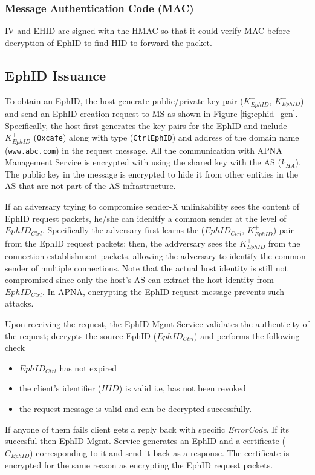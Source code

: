 \subsubsection{Message Authentication Code (MAC)}
IV and EHID are signed with the HMAC so that it could verify MAC before decryption of EphID to find HID to forward the packet.

\subsection{EphID Issuance} \label{sec:why_encrypt}
To obtain an EphID, the host generate public/private key pair ($K^{+}_{EphID}$, $K^{-}_{EphID}$) and send an EphID creation request to MS as shown in Figure \ref{fig:ephid_gen}. Specifically, the host first generates the key pairs for the EphID and include $K^{+}_{EphID}$ (\texttt{0xcafe}) along with type (\texttt{CtrlEphID}) and address of the domain name (\texttt{www.abc.com}) in the request message. All the communication with APNA Management Service is encrypted with using the shared key with the AS ($k_{HA}$). The public key in the message is encrypted to hide it from other entities in the AS that are not part of the AS infrastructure.

If an adversary trying to compromise sender-X unlinkability sees the content of EphID request packets, he/she can idenitfy a common sender at the level of $EphID_{Ctrl}$. Specifically the adversary first learns the ($EphID_{Ctrl}$, $K^{+}_{EphID}$) pair from the EphID request packets; then, the addversary sees the $K^{+}_{EphID}$ from the connection establishment packets, allowing the adversary to identify the common sender of multiple connections. Note that the actual host identity is still not compromised since only the host's AS can extract the host identity from $EphID_{Ctrl}$. In APNA, encrypting the EphID request message prevents such attacks.

Upon receiving the request, the EphID Mgmt Service validates the authenticity of the request; decrypts the source EphID ($EphID_{Ctrl}$) and performs the following check
\begin{itemize}
    \item $EphID_{Ctrl}$ has not expired
    \item the client's identifier ($HID$) is valid i.e, has not been revoked
    \item the request message is valid and can be decrypted successfully.
\end{itemize}
If anyone of them fails client gets a reply back with specific \textit{ErrorCode}. If its succesful then EphID Mgmt. Service generates an EphID and a certificate ($C_{EphID}$) corresponding to it and send it back as a response. The certificate is encrypted for the same reason as encrypting the EphID request packets.

